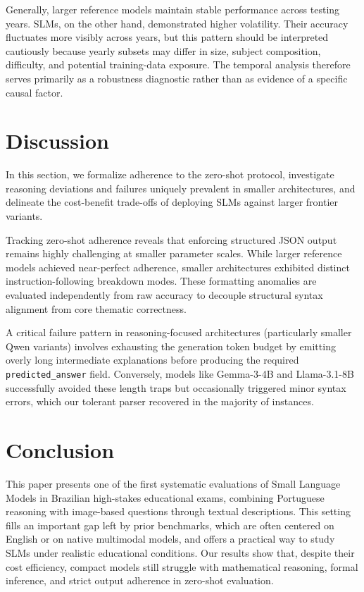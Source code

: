 \documentclass[12pt]{article}
\begin{document}
Generally, larger reference models maintain stable performance across testing years. SLMs, on the other hand, demonstrated higher volatility. Their accuracy fluctuates more visibly across years, but this pattern should be interpreted cautiously because yearly subsets may differ in size, subject composition, difficulty, and potential training-data exposure. The temporal analysis therefore serves primarily as a robustness diagnostic rather than as evidence of a specific causal factor.

\section{Discussion}
\label{sec:discussion}

In this section, we formalize adherence to the zero-shot protocol, investigate reasoning deviations and failures uniquely prevalent in smaller architectures, and delineate the cost-benefit trade-offs of deploying SLMs against larger frontier variants.

Tracking zero-shot adherence reveals that enforcing structured JSON output remains highly challenging at smaller parameter scales. While larger reference models achieved near-perfect adherence, smaller architectures exhibited distinct instruction-following breakdown modes. These formatting anomalies are evaluated independently from raw accuracy to decouple structural syntax alignment from core thematic correctness.

A critical failure pattern in reasoning-focused architectures (particularly smaller Qwen variants) involves exhausting the generation token budget by emitting overly long intermediate explanations before producing the required \texttt{predicted\_answer} field. Conversely, models like Gemma-3-4B and Llama-3.1-8B successfully avoided these length traps but occasionally triggered minor syntax errors, which our tolerant parser recovered in the majority of instances.

\section{Conclusion}
\label{sec:conclusion}

This paper presents one of the first systematic evaluations of Small Language Models in Brazilian high-stakes educational exams, combining Portuguese reasoning with image-based questions through textual descriptions. This setting fills an important gap left by prior benchmarks, which are often centered on English or on native multimodal models, and offers a practical way to study SLMs under realistic educational conditions. Our results show that, despite their cost efficiency, compact models still struggle with mathematical reasoning, formal inference, and strict output adherence in zero-shot evaluation.
\end{document}
